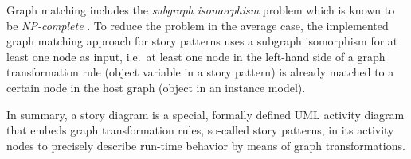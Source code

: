 Graph matching includes the \emph{subgraph isomorphism} problem which is known to be \emph{NP-complete} \cite{Epp95}.
To reduce the problem in the average case, the implemented graph matching approach for story patterns
uses a subgraph isomorphism for at least one node as input,
i.e.\ at least one node in the left-hand side of a graph transformation rule (object variable in a story pattern)
is already matched to a certain node in the host graph (object in an instance model).

In summary, a story diagram is a special, formally defined UML activity diagram
that embeds graph transformation rules, so-called story patterns, in its activity nodes
to precisely describe run-time behavior by means of graph transformations.

